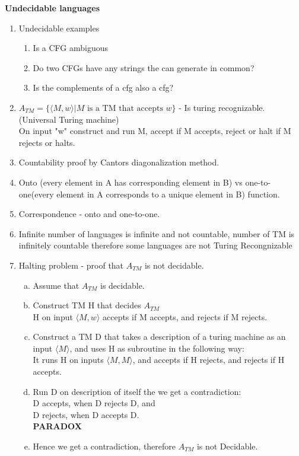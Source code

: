 \documentclass{article}
\newcommand\curl[1]{\{#1\}}
\newcommand\angl[1]{\langle #1 \rangle}}
\begin{document}
\textbf{Undecidable languages}
\begin{enumerate}[1., leftmargin = 0.5cm]
\itemsep0em

    \item  Undecidable examples
        \begin{enumerate}[1., leftmargin = 0.5cm]
        \itemsep0em
        \item Is a CFG ambiguous
        \item Do two CFGs have any strings the can generate in common?
        \item Is the complements of a cfg also a cfg?
        \end{enumerate}
    
    \item $A_{TM} = \curl{\langle M, w \rangle | M \text{ is a TM that accepts } w }$ - Is turing recognizable. (Universal Turing machine)\\
        On input "w" construct and run M, accept if M accepts, reject or halt if M rejects or halts.

    \item Countability proof by Cantors diagonalization method.
    \item Onto (every element in A has corresponding element in B) vs one-to-one(every element in A corresponds to a unique element in B) function. 
    \item Correspondence - onto and one-to-one.
    \item Infinite number of languages is infinite and not countable, number of TM is infinitely countable therefore some languages are not Turing
        Recongnizable

    \item Halting problem - proof that $A_{TM}$ is not decidable.
        \begin{enumerate}[a., leftmargin = 0.5cm]
        \itemsep0em
            \item Assume that $A_{TM}$ is decidable.
            \item Construct TM H that decides $A_{TM}$\\
                H on input $\angl{M,w}$ accepts if M accepts, and rejects if M rejects.
                
            \item Construct a TM D that takes a description of a turing machine as an input $\angl{M}$, and uses H as subroutine in the following way: \\
                It runs H on inputs $\angl{M,M}$, and accepts if H rejects, and rejects if H accepts.
            \item  Run D on description of itself the we get a contradiction:\\
                D accepts, when D rejects D, and \\
                D rejects, when D accepts D. \\
                \textbf{PARADOX}
            \item Hence we get a contradiction, therefore $A_{TM}$ is not Decidable.
        \end{enumerate}


\end{enumerate}
\end{document}
